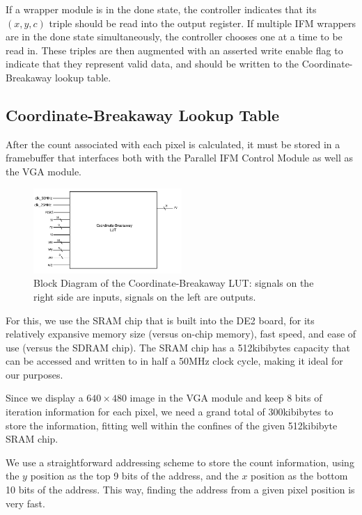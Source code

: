 \documentclass{article}
\begin{document}
If a wrapper module is in the done state, the controller indicates that its $(x, y, c)$ triple should be read into
the output register. If multiple IFM wrappers are in the done state simultaneously, the controller chooses one at a
time to be read in. These triples are then augmented with an asserted write enable flag to indicate that they represent
valid data, and should be written to the Coordinate-Breakaway lookup table. 


\subsection{Coordinate-Breakaway Lookup Table}

After the count associated with each pixel is calculated, it must be
stored in a framebuffer that interfaces both with the Parallel IFM
Control Module as well as the VGA module.

\begin{figure}[H]
  \centering
    \includegraphics[width=160pt]{block_diagrams/clut.pdf}
  \caption{Block Diagram of the Coordinate-Breakaway LUT: signals on
    the right side are inputs, signals on the left are outputs.}
\end{figure}

For this, we use the SRAM chip that is built into the DE2 board, for
its relatively expansive memory size (versus on-chip memory), fast
speed, and ease of use (versus the SDRAM chip). The SRAM chip has a 
512kibibytes capacity that can be accessed and written to in half a 50MHz
clock cycle, making it ideal for our purposes.

Since we display a $640\times 480$ image in the VGA module and keep 8
bits of iteration information for each pixel, we need a grand total of
300kibibytes to store the information, fitting well within the
confines of the given 512kibibyte SRAM chip.

We use a straightforward addressing scheme to store the count
information, using the $y$ position as the top 9 bits of the address,
and the $x$ position as the bottom 10 bits of the address. This way,
finding the address from a given pixel position is very fast.
\end{document}
